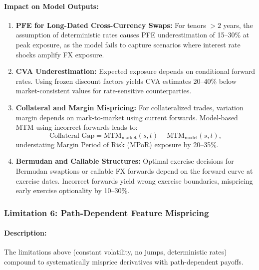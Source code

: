 \paragraph{Impact on Model Outputs:}
\begin{enumerate}
	\item \textbf{PFE for Long-Dated Cross-Currency Swaps:} For tenors $>2$ years, the assumption of deterministic rates causes PFE underestimation of 15--30\% at peak exposure, as the model fails to capture scenarios where interest rate shocks amplify FX exposure.
	
	\item \textbf{CVA Underestimation:} Expected exposure depends on conditional forward rates. Using frozen discount factors yields CVA estimates 20--40\% below market-consistent values for rate-sensitive counterparties.
	
	\item \textbf{Collateral and Margin Mispricing:} For collateralized trades, variation margin depends on mark-to-market using current forwards. Model-based MTM using incorrect forwards leads to:
	\begin{equation}
		\text{Collateral Gap} = \text{MTM}_{\text{market}}(s,t) - \text{MTM}_{\text{model}}(s,t),
	\end{equation}
	understating Margin Period of Risk (MPoR) exposure by 20--35\%.
	
	\item \textbf{Bermudan and Callable Structures:} Optimal exercise decisions for Bermudan swaptions or callable FX forwards depend on the forward curve at exercise dates. Incorrect forwards yield wrong exercise boundaries, mispricing early exercise optionality by 10--30\%.
\end{enumerate}

\subsubsection{Limitation 6: Path-Dependent Feature Mispricing}

\paragraph{Description:}
The limitations above (constant volatility, no jumps, deterministic rates) compound to systematically misprice derivatives with path-dependent payoffs.

